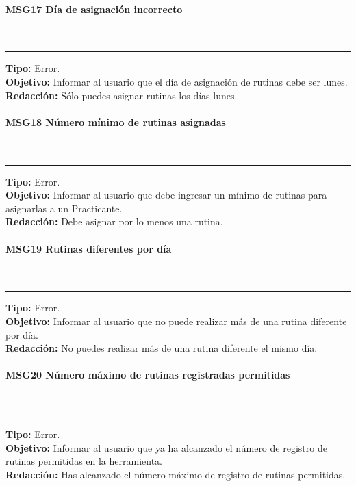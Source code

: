 \paragraph{\textcolor[rgb]{0, 0, 0.545098}{MSG17 Día de asignación incorrecto}} \hspace{1cm} \\
\label{msj:MSG17}
\rule[3mm]{16.59cm}{0.1mm} \vspace{1mm}
\textbf{Tipo:} Error.\\
\textbf{Objetivo:} Informar al usuario que el día de asignación de rutinas debe ser lunes.\\
\textbf{Redacción:} Sólo puedes asignar rutinas los días lunes.\\

\paragraph{\textcolor[rgb]{0, 0, 0.545098}{MSG18 Número mínimo de rutinas asignadas}} \hspace{1cm} \\
\label{msj:MSG18}
\rule[3mm]{16.59cm}{0.1mm} \vspace{1mm}
\textbf{Tipo:} Error.\\
\textbf{Objetivo:} Informar al usuario que debe ingresar un mínimo de rutinas para asignarlas a un Practicante.\\
\textbf{Redacción:} Debe asignar por lo menos una rutina.\\

\paragraph{\textcolor[rgb]{0, 0, 0.545098}{MSG19 Rutinas diferentes por día}} \hspace{1cm} \\
\label{msj:MSG19}
\rule[3mm]{16.59cm}{0.1mm} \vspace{1mm}
\textbf{Tipo:} Error.\\
\textbf{Objetivo:} Informar al usuario que no puede realizar más de una rutina diferente por día.\\
\textbf{Redacción:} No puedes realizar más de una rutina diferente el mismo día.\\

\paragraph{\textcolor[rgb]{0, 0, 0.545098}{MSG20 Número máximo de rutinas registradas permitidas}} \hspace{1cm} \\
\label{msj:MSG20}
\rule[3mm]{16.59cm}{0.1mm} \vspace{1mm}
\textbf{Tipo:} Error.\\
\textbf{Objetivo:} Informar al usuario que ya ha alcanzado el número de registro de rutinas permitidas en la herramienta.\\
\textbf{Redacción:} Has alcanzado el número máximo de registro de rutinas permitidas.\\

